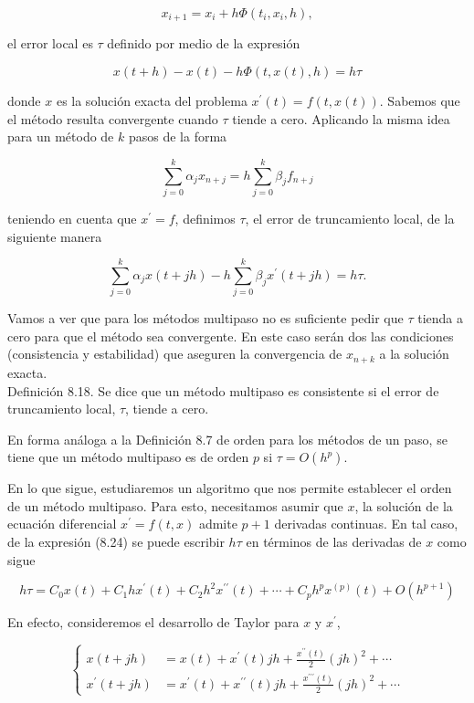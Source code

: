 \documentclass[10pt]{book}
\begin{document}
$$
x_{i+1}=x_{i}+h \Phi\left(t_{i}, x_{i}, h\right),
$$

el error local es $\tau$ definido por medio de la expresión

$$
x(t+h)-x(t)-h \Phi(t, x(t), h)=h \tau
$$

donde $x$ es la solución exacta del problema $x^{\prime}(t)=f(t, x(t))$. Sabemos que el método resulta convergente cuando $\tau$ tiende a cero. Aplicando la misma idea para un método de $k$ pasos de la forma

$$
\sum_{j=0}^{k} \alpha_{j} x_{n+j}=h \sum_{j=0}^{k} \beta_{j} f_{n+j}
$$

teniendo en cuenta que $x^{\prime}=f$, definimos $\tau$, el error de truncamiento local, de la siguiente manera


\begin{equation*}
\sum_{j=0}^{k} \alpha_{j} x(t+j h)-h \sum_{j=0}^{k} \beta_{j} x^{\prime}(t+j h)=h \tau . \tag{8.24}
\end{equation*}


Vamos a ver que para los métodos multipaso no es suficiente pedir que $\tau$ tienda a cero para que el método sea convergente. En este caso serán dos las condiciones (consistencia y estabilidad) que aseguren la convergencia de $x_{n+k}$ a la solución exacta.\\
Definición 8.18. Se dice que un método multipaso es consistente si el error de truncamiento local, $\tau$, tiende a cero.

En forma análoga a la Definición 8.7 de orden para los métodos de un paso, se tiene que un método multipaso es de orden $p$ si $\tau=O\left(h^{p}\right)$.

En lo que sigue, estudiaremos un algoritmo que nos permite establecer el orden de un método multipaso. Para esto, necesitamos asumir que $x$, la solución de la ecuación diferencial $x^{\prime}=f(t, x)$ admite $p+1$ derivadas continuas. En tal caso, de la expresión (8.24) se puede escribir $h \tau$ en términos de las derivadas de $x$ como sigue


\begin{equation*}
h \tau=C_{0} x(t)+C_{1} h x^{\prime}(t)+C_{2} h^{2} x^{\prime \prime}(t)+\cdots+C_{p} h^{p} x^{(p)}(t)+O\left(h^{p+1}\right) \tag{8.25}
\end{equation*}


En efecto, consideremos el desarrollo de Taylor para $x$ y $x^{\prime}$,

$$
\left\{\begin{aligned}
x(t+j h) & =x(t)+x^{\prime}(t) j h+\frac{x^{\prime \prime}(t)}{2}(j h)^{2}+\cdots \\
x^{\prime}(t+j h) & =x^{\prime}(t)+x^{\prime \prime}(t) j h+\frac{x^{\prime \prime \prime}(t)}{2}(j h)^{2}+\cdots
\end{aligned}\right.
$$
\end{document}
